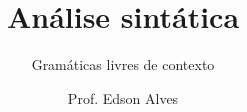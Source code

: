 \title{Análise sintática}
\subtitle{Gramáticas livres de contexto}
\date{}
\author{Prof. Edson Alves}
